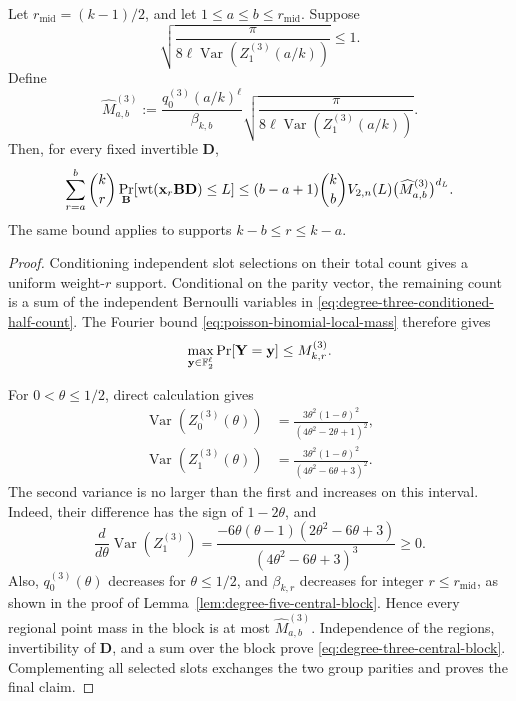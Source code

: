 \begin{lemma}
\label{lem:degree-three-central-block}
Let $r_{\mathrm{mid}}=(k-1)/2$, and let
$1\leq a\leq b\leq r_{\mathrm{mid}}$.  Suppose
\begin{equation*}
 \sqrt{\frac{\pi}
 {8\ell\operatorname{Var}(Z^{(3)}_1(a/k))}}\leq1.
\end{equation*}
Define
\begin{equation}
 \widehat M^{(3)}_{a,b}:=
 \frac{q^{(3)}_0(a/k)^\ell}{\beta_{k,b}}
 \sqrt{\frac{\pi}
 {8\ell\operatorname{Var}(Z^{(3)}_1(a/k))}}.
 \label{eq:degree-three-block-point-mass}
\end{equation}
Then, for every fixed invertible $\mathbf D$,
\begin{equation}
 \sum_{r=a}^{b}\binom{k}{r}
 \Pr_{\mathbf B}[\operatorname{wt}(\mathbf x_r\mathbf B\mathbf D)\leq L]
 \leq(b-a+1)\binom{k}{b}V_{2,n}(L)
 \bigl(\widehat M^{(3)}_{a,b}\bigr)^{d_L}.
 \label{eq:degree-three-central-block}
\end{equation}
The same bound applies to supports $k-b\leq r\leq k-a$.
\end{lemma}

\begin{proof}
Conditioning independent slot selections on their total count gives a uniform
weight-$r$ support.  Conditional on the parity vector, the remaining count is
a sum of the independent Bernoulli variables in
\eqref{eq:degree-three-conditioned-half-count}.  The Fourier bound
\eqref{eq:poisson-binomial-local-mass} therefore gives
\begin{equation*}
 \max_{\mathbf y\in\mathbb F_2^\ell}\Pr[\mathbf Y=\mathbf y]
 \leq M^{(3)}_{k,r}.
\end{equation*}

For $0<\theta\leq1/2$, direct calculation gives
\begin{align*}
 \operatorname{Var}(Z^{(3)}_0(\theta))
 &=\frac{3\theta^2(1-\theta)^2}{(4\theta^2-2\theta+1)^2},\\
 \operatorname{Var}(Z^{(3)}_1(\theta))
 &=\frac{3\theta^2(1-\theta)^2}{(4\theta^2-6\theta+3)^2}.
\end{align*}
The second variance is no larger than the first and increases on this
interval.  Indeed, their difference has the sign of $1-2\theta$, and
\begin{equation*}
 \frac{d}{d\theta}\operatorname{Var}(Z^{(3)}_1)
 =\frac{-6\theta(\theta-1)(2\theta^2-6\theta+3)}
 {(4\theta^2-6\theta+3)^3}\geq0.
\end{equation*}
Also, $q^{(3)}_0(\theta)$ decreases for $\theta\leq1/2$, and
$\beta_{k,r}$ decreases for integer $r\leq r_{\mathrm{mid}}$, as shown in
the proof of Lemma~\ref{lem:degree-five-central-block}.  Hence every regional point mass
in the block is at most $\widehat M^{(3)}_{a,b}$.  Independence of the
regions, invertibility of $\mathbf D$, and a sum over the block prove
\eqref{eq:degree-three-central-block}.  Complementing all selected slots
exchanges the two group parities and proves the final claim.
\end{proof}

